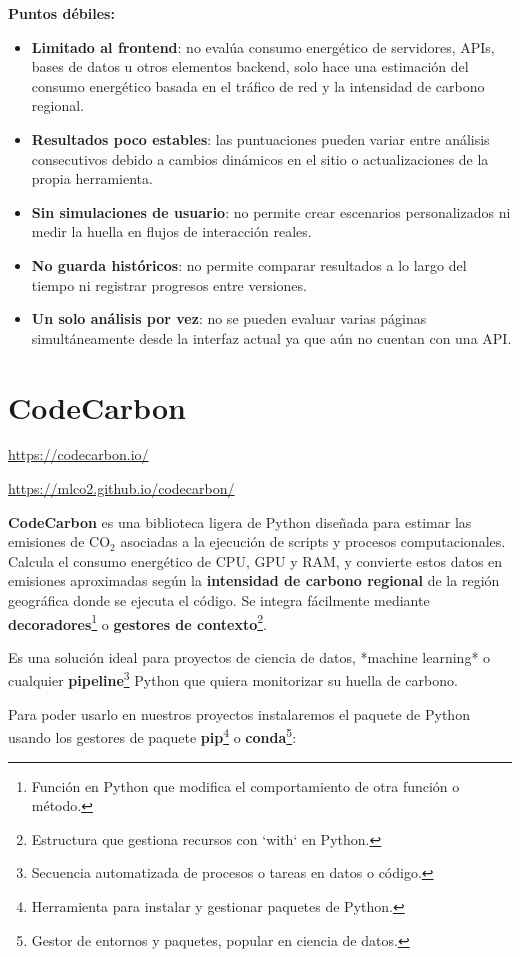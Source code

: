 \documentclass[12pt,a4paper]{report}
\begin{document}
\textbf{Puntos débiles:}
\begin{itemize}
  \item \textbf{Limitado al frontend}: no evalúa consumo energético de servidores, APIs, bases de datos u otros elementos backend, solo hace una estimación del consumo energético basada en el tráfico de red y la intensidad de carbono regional.
  \item \textbf{Resultados poco estables}: las puntuaciones pueden variar entre análisis consecutivos debido a cambios dinámicos en el sitio o actualizaciones de la propia herramienta.
  \item \textbf{Sin simulaciones de usuario}: no permite crear escenarios personalizados ni medir la huella en flujos de interacción reales.
  \item \textbf{No guarda históricos}: no permite comparar resultados a lo largo del tiempo ni registrar progresos entre versiones.
  \item \textbf{Un solo análisis por vez}: no se pueden evaluar varias páginas simultáneamente desde la interfaz actual ya que aún no cuentan con una API.
\end{itemize}

\section*{\textbf{CodeCarbon}}

\url{https://codecarbon.io/}

\url{https://mlco2.github.io/codecarbon/}

\textbf{CodeCarbon} es una biblioteca ligera de Python diseñada para estimar las emisiones de CO$_2$ asociadas a la ejecución de scripts y procesos computacionales. Calcula el consumo energético de CPU, GPU y RAM, y convierte estos datos en emisiones aproximadas según la \textbf{intensidad de carbono regional} de la región geográfica donde se ejecuta el código. Se integra fácilmente mediante \textbf{decoradores}\footnote{Función en Python que modifica el comportamiento de otra función o método.} o \textbf{gestores de contexto}\footnote{Estructura que gestiona recursos con `with` en Python.}.

Es una solución ideal para proyectos de ciencia de datos, *machine learning* o
cualquier \textbf{pipeline}\footnote{Secuencia automatizada de procesos o
  tareas en datos o código.} Python que quiera monitorizar su huella de carbono.

Para poder usarlo en nuestros proyectos instalaremos el paquete de Python
usando los gestores de paquete \textbf{pip}\footnote{Herramienta para instalar
  y gestionar paquetes de Python.} o \textbf{conda}\footnote{Gestor de entornos y
  paquetes, popular en ciencia de datos.}:
\end{document}
